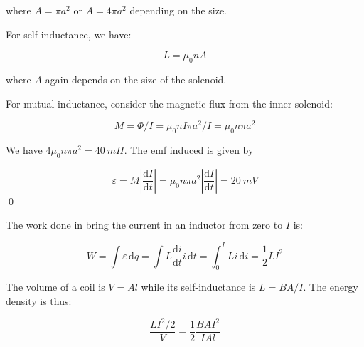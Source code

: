 \documentclass[12pt]{article}
\begin{document}
where $A = \pi a^{2}$ or $A = 4\pi a^{2}$ depending on the size.

For self-inductance, we have:

\begin{equation}
    L = \mu_{0} nA
\end{equation}

where $A$ again depends on the size of the solenoid.

For mutual inductance, consider the magnetic flux from the inner solenoid:

\begin{equation}
    M = \Phi/I = \mu_{0} nI \pi a^{2}/I = \mu_{0} n \pi a^{2}
\end{equation}

We have $4\mu_{0} n \pi a^{2} = \qty{40}{mH}$. The emf induced is given by

\begin{equation}
    \varepsilon = M \left\lvert \frac{\mathrm{d}I}{\mathrm{d}t} \right\rvert = \mu_{0} n \pi a^{2} \left\lvert \frac{\mathrm{d}I}{\mathrm{d}t} \right\rvert = \qty{20}{mV}
\end{equation}
\qed


The work done in bring the current in an inductor from zero to $I$ is:

\begin{equation}
    W = \int \varepsilon \, \mathrm{d}q = \int L \frac{\mathrm{d}i}{\mathrm{d}t} i \, \mathrm{d}t = \int_{0}^{I} L i \, \mathrm{d}i = \frac{1}{2} LI^{2}
\end{equation}

The volume of a coil is $V = A l$ while its self-inductance is $L = BA/I$. The energy density is thus:

\begin{equation}
    \frac{LI^{2}/2}{V} = \frac{1}{2} \frac{BAI^{2}}{IAl}
\end{equation}
\end{document}
